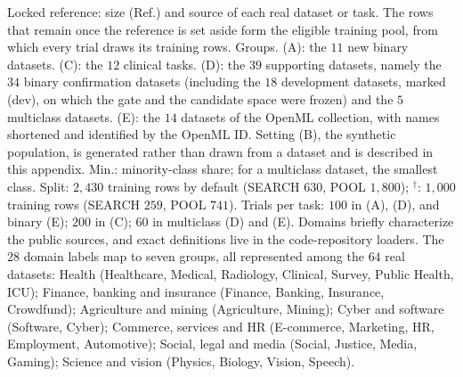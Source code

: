 \begin{table}[!t]
\vspace{2pt}
\parbox{\textwidth}{\justifying\scriptsize *Locked reference: size (Ref.) and source of each real dataset or task. The rows that remain once the reference is set aside form the eligible training pool, from which every trial draws its training rows. Groups. (A): the $11$ new binary datasets. (C): the $12$ clinical tasks. (D): the $39$ supporting datasets, namely the $34$ binary confirmation datasets (including the $18$ development datasets, marked (dev), on which the gate and the candidate space were frozen) and the $5$ multiclass datasets. (E): the $14$ datasets of the OpenML collection, with names shortened and identified by the OpenML ID. Setting (B), the synthetic population, is generated rather than drawn from a dataset and is described in this appendix. Min.: minority-class share; for a multiclass dataset, the smallest class. Split: $2{,}430$ training rows by default (SEARCH $630$, POOL $1{,}800$); $^{\dagger}$: $1{,}000$ training rows (SEARCH $259$, POOL $741$). Trials per task: $100$ in (A), (D), and binary (E); $200$ in (C); $60$ in multiclass (D) and (E). Domains briefly characterize the public sources, and exact definitions live in the code-repository loaders. The $28$ domain labels map to seven groups, all represented among the $64$ real datasets: Health (Healthcare, Medical, Radiology, Clinical, Survey, Public Health, ICU); Finance, banking and insurance (Finance, Banking, Insurance, Crowdfund); Agriculture and mining (Agriculture, Mining); Cyber and software (Software, Cyber); Commerce, services and HR (E-commerce, Marketing, HR, Employment, Automotive); Social, legal and media (Social, Justice, Media, Gaming); Science and vision (Physics, Biology, Vision, Speech).}
\end{table}
